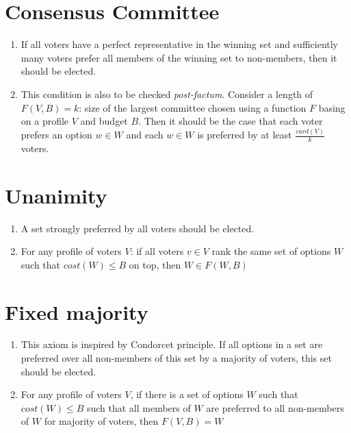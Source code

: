 \documentclass{article}
\begin{document}
\section{Consensus Committee}
\begin{enumerate}
\item If all voters have a perfect representative in the winning set and  sufficiently many voters prefer all members of the winning set to non-members, then it should be elected.
\item This condition is also to be checked \textit{post-factum}. Consider a length of $F(V, B)=k$: size of the largest committee chosen using a function $F$ basing on a profile $V$ and budget $B$. Then it should be the case that  each voter prefers an option $w \in W$ and each $w \in W$ is preferred by at least $\frac{card(V)}{k}$ voters. 
\end{enumerate}

\section{Unanimity}
\begin{enumerate}
\item A set strongly preferred by all voters should be elected.
\item For any profile of voters $V$: if all voters $v \in V$ rank the same set of options $W$ such that $cost(W) \leq B$ on top, then $W \in F(W, B)$
\end{enumerate}

\section{Fixed majority}
\begin{enumerate}
\item This axiom is inspired by Condorcet principle. If all options in a set are preferred over all non-members of this set by a majority of voters, this set should be elected.
\item For any profile of voters $V$, if there is a set of options $W$ such that $cost(W) \leq B$ such that all members of $W$ are preferred to all non-members of $W$ for majority of voters, then $F(V, B) = W$ 
\end{enumerate}
\end{document}
